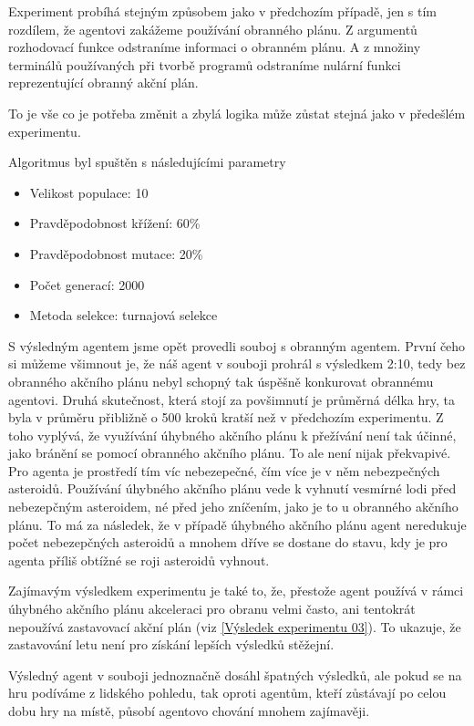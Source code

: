\par
Experiment probíhá stejným způsobem jako v předchozím případě, jen s tím rozdílem, že agentovi zakážeme používání obranného plánu. 
Z argumentů rozhodovací funkce odstraníme informaci o obranném plánu. 
A z množiny terminálů používaných při tvorbě programů odstraníme nulární funkci reprezentující obranný akční plán.

\par
To je vše co je potřeba změnit a zbylá logika může zůstat stejná jako v předešlém experimentu.

Algoritmus byl spuštěn s následujícími parametry
\begin{itemize}
    \item Velikost populace: 10
    \item Pravděpodobnost křížení: 60\%
    \item Pravděpodobnost mutace: 20\%
    \item Počet generací: 2000
    \item Metoda selekce: turnajová selekce
\end{itemize}

S výsledným agentem jsme opět provedli souboj s obranným agentem.
První čeho si můžeme všimnout je, že náš agent v souboji prohrál s výsledkem 2:10, tedy bez obranného akčního plánu nebyl schopný tak úspěšně konkurovat obrannému agentovi.
Druhá skutečnost, která stojí za povšimnutí je průměrná délka hry, ta byla v průměru přibližně o 500 kroků kratší než v předchozím experimentu. 
Z toho vyplývá, že využívání úhybného akčního plánu k přežívání není tak účinné, jako bránění se pomocí obranného akčního plánu. 
To ale není nijak překvapivé. Pro agenta je prostředí tím víc nebezepečné, čím více je v něm nebezpečných asteroidů. 
Používání úhybného akčního plánu vede k vyhnutí vesmírné lodi před nebezepčným asteroidem, né před jeho zníčením, jako je to u obranného akčního plánu. To má za následek, že v případě úhybného akčního plánu agent neredukuje počet nebezepčných asteroidů a mnohem dříve se dostane do stavu, kdy je pro agenta příliš obtížné se roji asteroidů vyhnout. 

\par
Zajímavým výsledkem experimentu je také to, že, přestože agent používá v rámci úhybného akčního plánu akceleraci pro obranu velmi často, ani tentokrát nepoužívá zastavovací akční plán (viz \ref{Výsledek experimentu 03}).
To ukazuje, že zastavování letu není pro získání lepších výsledků stěžejní.
\par
Výsledný agent v souboji jednoznačně dosáhl špatných výsledků, ale pokud se na hru podíváme z lidského pohledu, tak oproti agentům, kteří zůstávají po celou dobu hry na místě, působí agentovo chování mnohem zajímavěji.


